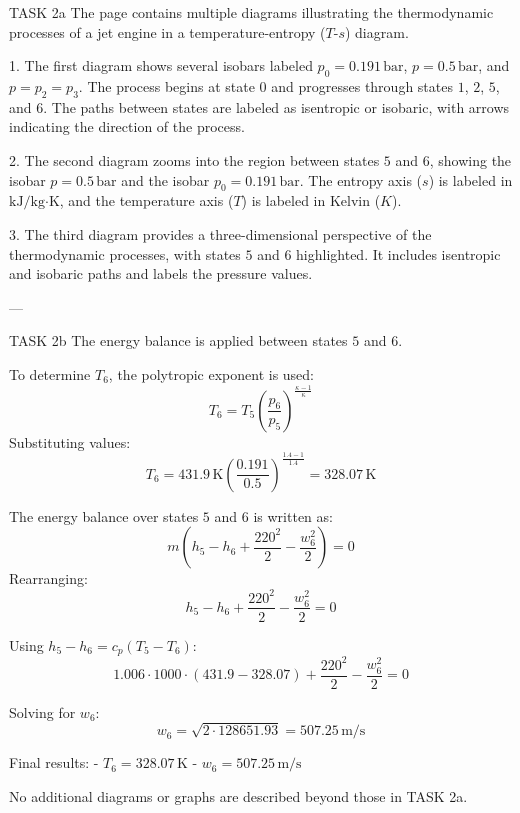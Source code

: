 TASK 2a  
The page contains multiple diagrams illustrating the thermodynamic processes of a jet engine in a temperature-entropy (\(T\)-\(s\)) diagram.  

1. The first diagram shows several isobars labeled \(p_0 = 0.191 \, \text{bar}\), \(p = 0.5 \, \text{bar}\), and \(p = p_2 = p_3\). The process begins at state \(0\) and progresses through states \(1\), \(2\), \(5\), and \(6\). The paths between states are labeled as isentropic or isobaric, with arrows indicating the direction of the process.  

2. The second diagram zooms into the region between states \(5\) and \(6\), showing the isobar \(p = 0.5 \, \text{bar}\) and the isobar \(p_0 = 0.191 \, \text{bar}\). The entropy axis (\(s\)) is labeled in \(\text{kJ}/\text{kg·K}\), and the temperature axis (\(T\)) is labeled in Kelvin (\(K\)).  

3. The third diagram provides a three-dimensional perspective of the thermodynamic processes, with states \(5\) and \(6\) highlighted. It includes isentropic and isobaric paths and labels the pressure values.  

---

TASK 2b  
The energy balance is applied between states \(5\) and \(6\).  

To determine \(T_6\), the polytropic exponent is used:  
\[
T_6 = T_5 \left( \frac{p_6}{p_5} \right)^{\frac{\kappa - 1}{\kappa}}
\]  
Substituting values:  
\[
T_6 = 431.9 \, \text{K} \left( \frac{0.191}{0.5} \right)^{\frac{1.4 - 1}{1.4}} = 328.07 \, \text{K}
\]  

The energy balance over states \(5\) and \(6\) is written as:  
\[
m \left( h_5 - h_6 + \frac{220^2}{2} - \frac{w_6^2}{2} \right) = 0
\]  
Rearranging:  
\[
h_5 - h_6 + \frac{220^2}{2} - \frac{w_6^2}{2} = 0
\]  

Using \(h_5 - h_6 = c_p (T_5 - T_6)\):  
\[
1.006 \cdot 1000 \cdot (431.9 - 328.07) + \frac{220^2}{2} - \frac{w_6^2}{2} = 0
\]  

Solving for \(w_6\):  
\[
w_6 = \sqrt{2 \cdot 128651.93} = 507.25 \, \text{m/s}
\]  

Final results:  
- \(T_6 = 328.07 \, \text{K}\)  
- \(w_6 = 507.25 \, \text{m/s}\)  

No additional diagrams or graphs are described beyond those in TASK 2a.